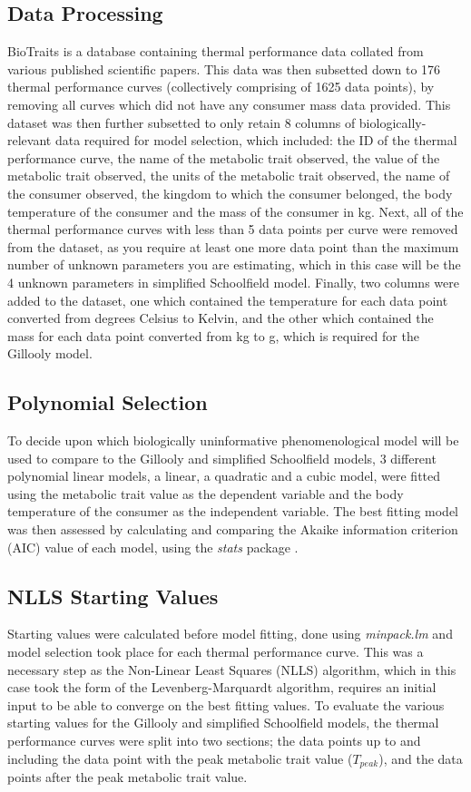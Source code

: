 \documentclass[11pt]{article}
\begin{document}
\begin{linenumbers}
\subsection{Data Processing}
BioTraits \citep{Dell2013} is a database containing thermal performance data collated from various published scientific papers. This data was then subsetted down to 176 thermal performance curves (collectively comprising of 1625 data points), by removing all curves which did not have any consumer mass data provided. This dataset was then further subsetted to only retain 8 columns of biologically-relevant data required for model selection, which included: the ID of the thermal performance curve, the name of the metabolic trait observed, the value of the metabolic trait observed, the units of the metabolic trait observed, the name of the consumer observed, the kingdom to which the consumer belonged, the body temperature of the consumer and the mass of the consumer in kg.
Next, all of the thermal performance curves with less than 5 data points per curve were removed from the dataset, as you require at least one more data point than the maximum number of unknown parameters you are estimating, which in this case will be the 4 unknown parameters in simplified Schoolfield model. Finally, two columns were added to the dataset, one which contained the temperature for each data point converted from degrees Celsius to Kelvin, and the other which contained the mass for each data point converted from kg to g, which is required for the Gillooly model.
\subsection{Polynomial Selection}
To decide upon which biologically uninformative phenomenological model will be used to compare to the Gillooly and simplified Schoolfield models, 3 different polynomial linear models, a linear, a quadratic and a cubic model, were fitted using the metabolic trait value as the dependent variable and the body temperature of the consumer as the independent variable. The best fitting model was then assessed by calculating and comparing the Akaike information criterion (AIC) value of each model, using the \textit{stats} package \citep{R2018}.
\subsection{NLLS Starting Values}
Starting values were calculated before model fitting, done using \textit{minpack.lm} \citep{Elzhov2016} and model selection took place for each thermal performance curve. This was a necessary step as the Non-Linear Least Squares (NLLS) algorithm, which in this case took the form of the Levenberg-Marquardt algorithm, requires an initial input to be able to converge on the best fitting values. To evaluate the various starting values for the Gillooly and simplified Schoolfield models, the thermal performance curves were split into two sections; the data points up to and including the data point with the peak metabolic trait value ($T_{peak}$), and the data points after the peak metabolic trait value. 

\end{linenumbers}
\end{document}
